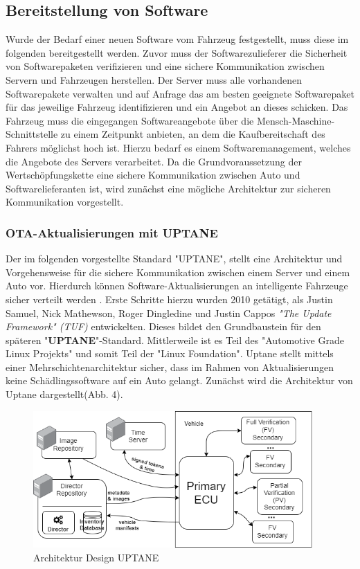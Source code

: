 \subsection{Bereitstellung von Software}
Wurde der Bedarf einer neuen Software vom Fahrzeug festgestellt, muss diese im folgenden bereitgestellt werden. Zuvor muss der Softwarezulieferer die Sicherheit von Softwarepaketen verifizieren und eine sichere Kommunikation zwischen Servern und Fahrzeugen herstellen. Der Server muss alle vorhandenen Softwarepakete verwalten und auf Anfrage das am besten geeignete Softwarepaket für das jeweilige Fahrzeug identifizieren und ein Angebot an dieses schicken. Das Fahrzeug muss die eingegangen Softwareangebote über die Mensch-Maschine-Schnittstelle zu einem Zeitpunkt anbieten, an dem die Kaufbereitschaft des Fahrers möglichst hoch ist. Hierzu bedarf es einem Softwaremanagement, welches die Angebote des Servers verarbeitet. Da die Grundvoraussetzung der Wertschöpfungskette eine sichere Kommunikation zwischen Auto und Softwarelieferanten ist, wird zunächst eine mögliche Architektur zur sicheren Kommunikation vorgestellt.

\subsubsection{OTA-Aktualisierungen mit UPTANE}\label{3.1}\label{uptane}
Der im folgenden vorgestellte Standard "UPTANE", stellt eine Architektur und Vorgehensweise für die sichere Kommunikation zwischen einem Server und einem Auto 
vor. Hierdurch können Software-Aktualisierungen an intelligente Fahrzeuge sicher verteilt werden \cite{uptane}. Erste Schritte hierzu wurden 2010 getätigt, als Justin Samuel, Nick Mathewson, Roger Dingledine und Justin Cappos \textit{"The Update Framework" (TUF)} entwickelten. Dieses bildet den Grundbaustein für den späteren "\textbf{UPTANE}"-Standard. Mittlerweile ist es Teil des "Automotive Grade Linux Projekts" und somit Teil der "Linux Foundation". Uptane stellt mittels einer Mehrschichtenarchitektur sicher, dass im Rahmen von Aktualisierungen keine Schädlingssoftware auf ein Auto gelangt. Zunächst wird die Architektur von Uptane dargestellt(Abb. 4).

\begin{figure}[H]
  \begin{center}
    \includegraphics[width=0.95\textwidth]{../pictures/meta_model_fs-uptane-original.png}
  \end{center}
  \caption{Architektur Design UPTANE \cite{uptane}}
\end{figure}

